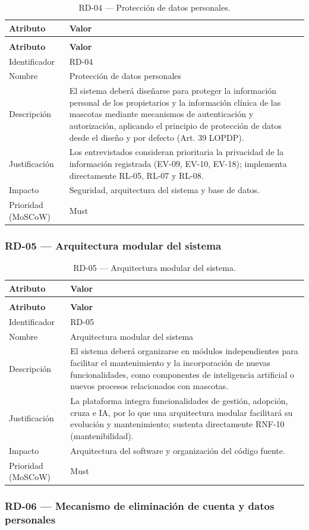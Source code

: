 \documentclass[journal,onecolumn]{IEEEtran}
\makeatletter
\newenvironment{atributos}[2]{%
	\small
	\begin{longtable}{@{}>{\raggedright\arraybackslash}p{4.2cm} >{\raggedright\arraybackslash}p{11.2cm}@{}}
		\caption{#2}\label{tab:#1}\\
		\toprule
		\textbf{Atributo} & \textbf{Valor} \\
		\midrule
		\endfirsthead
		\multicolumn{2}{@{}l}{\small\itshape (continuación)}\\
		\toprule
		\textbf{Atributo} & \textbf{Valor} \\
		\midrule
		\endhead
		\bottomrule
		\endlastfoot
	}{%
	\end{longtable}
	\normalsize
}
\makeatother
\begin{document}
	\begin{atributos}{RD-04}{RD-04 --- Protección de datos personales.}
		Identificador & RD-04 \\
		Nombre & Protección de datos personales \\
		Descripción & El sistema deberá diseñarse para proteger la información personal de los propietarios y la información clínica de las mascotas mediante mecanismos de autenticación y autorización, aplicando el principio de protección de datos desde el diseño y por defecto (Art. 39 LOPDP). \\
		Justificación & Los entrevistados consideran prioritaria la privacidad de la información registrada (EV-09, EV-10, EV-18); implementa directamente RL-05, RL-07 y RL-08. \\
		Impacto & Seguridad, arquitectura del sistema y base de datos. \\
		Prioridad (MoSCoW) & Must \\
	\end{atributos}
	
	\subsubsection{RD-05 --- Arquitectura modular del sistema}
	
	\begin{atributos}{RD-05}{RD-05 --- Arquitectura modular del sistema.}
		Identificador & RD-05 \\
		Nombre & Arquitectura modular del sistema \\
		Descripción & El sistema deberá organizarse en módulos independientes para facilitar el mantenimiento y la incorporación de nuevas funcionalidades, como componentes de inteligencia artificial o nuevos procesos relacionados con mascotas. \\
		Justificación & La plataforma integra funcionalidades de gestión, adopción, cruza e IA, por lo que una arquitectura modular facilitará su evolución y mantenimiento; sustenta directamente RNF-10 (mantenibilidad). \\
		Impacto & Arquitectura del software y organización del código fuente. \\
		Prioridad (MoSCoW) & Must \\
	\end{atributos}
	
	\subsubsection{RD-06 --- Mecanismo de eliminación de cuenta y datos personales}
	
\end{document}
